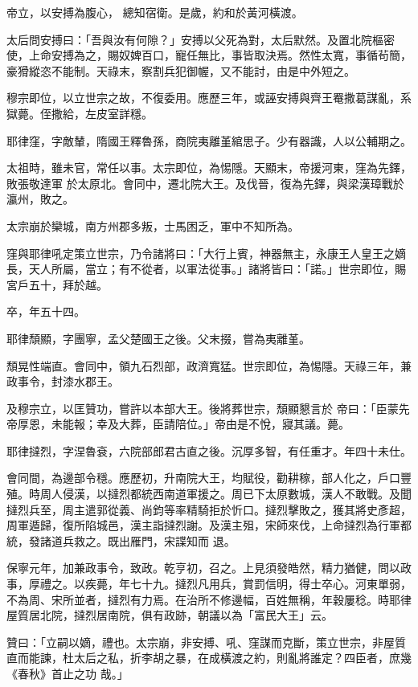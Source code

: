 \begin{pinyinscope}
 帝立，以安搏為腹心，
 總知宿衛。是歲，約和於黃河橫渡。



 太后問安搏曰：「吾與汝有何隙？」安搏以父死為對，太后默然。及置北院樞密使，上命安搏為之，賜奴婢百口，寵任無比，事皆取決焉。然性太寬，事循茍簡，豪猾縱恣不能制。天祿末，察割兵犯御幄，又不能討，由是中外短之。



 穆宗即位，以立世宗之故，不復委用。應歷三年，或誣安搏與齊王罨撒葛謀亂，系獄薨。侄撒給，左皮室詳穩。



 耶律窪，字敵輦，隋國王釋魯孫，商院夷離堇綰思子。少有器識，人以公輔期之。



 太祖時，雖未官，常任以事。太宗即位，為惕隱。天顯末，帝援河東，窪為先鐸，敗張敬達軍
 於太原北。會同中，遷北院大王。及伐晉，復為先鐸，與梁漢璋戰於瀛州，敗之。



 太宗崩於欒城，南方州郡多叛，士馬困乏，軍中不知所為。



 窪與耶律吼定策立世宗，乃令諸將曰：「大行上賓，神器無主，永康王人皇王之嫡長，天人所屬，當立；有不從者，以軍法從事。」諸將皆曰：「諾。」世宗即位，賜宮戶五十，拜於越。



 卒，年五十四。



 耶律頹顯，字團寧，孟父楚國王之後。父末掇，嘗為夷離堇。



 頹晃性端直。會同中，領九石烈部，政濟寬猛。世宗即位，為惕隱。天祿三年，兼政事令，封漆水郡王。



 及穆宗立，以匡贊功，嘗許以本部大王。後將葬世宗，頹顯懇言於
 帝曰：「臣蒙先帝厚恩，未能報；幸及大葬，臣請陪位。」帝由是不悅，寢其議。薨。



 耶律撻烈，字涅魯袞，六院部郎君古直之後。沉厚多智，有任重才。年四十未仕。



 會同間，為邊部令穩。應歷初，升南院大王，均賦役，勸耕稼，部人化之，戶口豐殖。時周人侵漢，以撻烈都統西南道軍援之。周已下太原數城，漢人不敢戰。及聞撻烈兵至，周主遣郭從義、尚鈞等率精騎拒於忻口。撻烈擊敗之，獲其將史彥超，周軍遁歸，復所陷城邑，漢主詣撻烈謝。及漢主殂，宋師來伐，上命撻烈為行軍都統，發諸道兵救之。既出雁門，宋諜知而
 退。



 保寧元年，加兼政事令，致政。乾亨初，召之。上見須發皓然，精力猶健，問以政事，厚禮之。以疾薨，年七十九。撻烈凡用兵，賞罰信明，得士卒心。河東單弱，不為周、宋所並者，撻烈有力焉。在治所不修邊幅，百姓無稱，年穀屢稔。時耶律屋質居北院，撻烈居南院，俱有政跡，朝議以為「富民大王」云。



 贊曰：「立嗣以嫡，禮也。太宗崩，非安搏、吼、窪謀而克斷，策立世宗，非屋質直而能諫，杜太后之私，折李胡之暴，在成橫渡之約，則亂將誰定？四臣者，庶幾《春秋》首止之功
 哉。」



\end{pinyinscope}